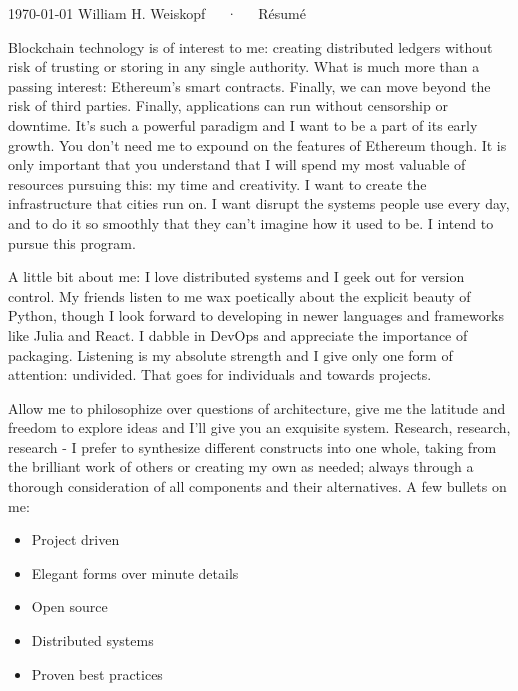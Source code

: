 \documentclass[11pt, letterpaper]{awesome-cv}
\begin{document}
\makecvheader

\makecvfooter
  {\today}
  {William H. Weiskopf~~~·~~~Résumé}
  {\thepage}



\vspace{5em}

Blockchain technology is of interest to me: creating distributed ledgers without risk of trusting or storing in any single authority.  What is much more than a passing interest: Ethereum's smart contracts.  Finally, we can move beyond the risk of third parties.  Finally, applications can run without censorship or downtime.  It's such a powerful paradigm and I want to be a part of its early growth.  You don't need me to expound on the features of Ethereum though.  It is only important that you understand that I will spend my most valuable of resources pursuing this: my time and creativity.  I want to create the infrastructure that cities run on.  I want disrupt the systems people use every day, and to do it so smoothly that they can't imagine how it used to be.  I intend to pursue this program.

A little bit about me: I love distributed systems and I geek out for version control. My friends listen to me wax poetically about the explicit beauty of Python, though I look forward to developing in newer languages and frameworks like Julia and React.  I dabble in DevOps and appreciate the importance of packaging. Listening is my absolute strength and I give only one form of attention: undivided.  That goes for individuals and towards projects. 

Allow me to philosophize over questions of architecture, give me the latitude and freedom to explore ideas and I'll give you an exquisite system. Research, research, research - I prefer to synthesize different constructs into one whole, taking from the brilliant work of others or creating my own as needed; always through a thorough consideration of all components and their alternatives. A few bullets on me:

\begin{itemize}[noitemsep]
  \item Project driven
  \item Elegant forms over minute details
  \item Open source
  \item Distributed systems
  \item Proven best practices
\end{itemize}
\end{document}
